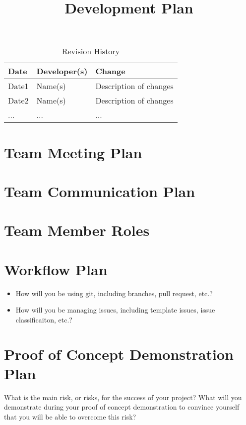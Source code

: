 \documentclass{article}
\title{Development Plan\\\progname}
\author{\authname}
\date{}
\begin{document}
\begin{table}[hp]
\caption{Revision History} \label{TblRevisionHistory}
\begin{tabularx}{\textwidth}{llX}
\toprule
\textbf{Date} & \textbf{Developer(s)} & \textbf{Change}\\
\midrule
Date1 & Name(s) & Description of changes\\
Date2 & Name(s) & Description of changes\\
... & ... & ...\\
\bottomrule
\end{tabularx}
\end{table}

\newpage

\maketitle


\section{Team Meeting Plan}

\section{Team Communication Plan}

\section{Team Member Roles}

\section{Workflow Plan}

\begin{itemize}
	\item How will you be using git, including branches, pull request, etc.?
	\item How will you be managing issues, including template issues, issue
	classificaiton, etc.?
\end{itemize}

\section{Proof of Concept Demonstration Plan}

What is the main risk, or risks, for the success of your project?  What will you
demonstrate during your proof of concept demonstration to convince yourself that
you will be able to overcome this risk?
\end{document}
